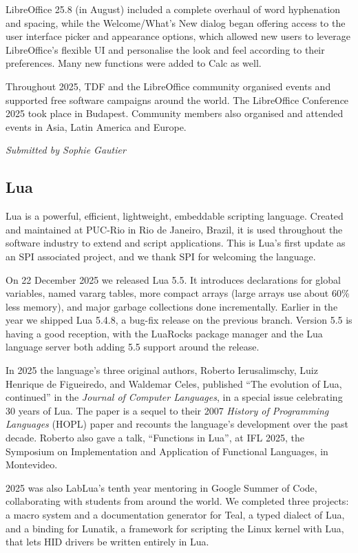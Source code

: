 \documentclass[a4paper]{report}
\begin{document}
LibreOffice 25.8 (in August) included a complete overhaul of word hyphenation and spacing, while the Welcome/What's New dialog began offering access to the user interface picker and appearance options, which allowed new users to leverage LibreOffice's flexible UI and personalise the look and feel according to their preferences. Many new functions were added to Calc as well.

Throughout 2025, TDF and the LibreOffice community organised events and supported free software campaigns around the world. The LibreOffice Conference 2025 took place in Budapest. Community members also organised and attended events in Asia, Latin America and Europe.

{\em Submitted by Sophie Gautier}

\subsection{Lua}

Lua is a powerful, efficient, lightweight, embeddable scripting language. Created and maintained at PUC-Rio in Rio de Janeiro, Brazil, it is used throughout the software industry to extend and script applications. This is Lua's first update as an SPI associated project, and we thank SPI for welcoming the language.

On 22 December 2025 we released Lua 5.5. It introduces declarations for global variables, named vararg tables, more compact arrays (large arrays use about 60\% less memory), and major garbage collections done incrementally. Earlier in the year we shipped Lua 5.4.8, a bug-fix release on the previous branch. Version 5.5 is having a good reception, with the LuaRocks package manager and the Lua language server both adding 5.5 support around the release.

In 2025 the language's three original authors, Roberto Ierusalimschy, Luiz Henrique de Figueiredo, and Waldemar Celes, published ``The evolution of Lua, continued'' in the \emph{Journal of Computer Languages}, in a special issue celebrating 30 years of Lua. The paper is a sequel to their 2007 \emph{History of Programming Languages} (HOPL) paper and recounts the language's development over the past decade. Roberto also gave a talk, ``Functions in Lua'', at IFL 2025, the Symposium on Implementation and Application of Functional Languages, in Montevideo.

2025 was also LabLua's tenth year mentoring in Google Summer of Code, collaborating with students from around the world. We completed three projects: a macro system and a documentation generator for Teal, a typed dialect of Lua, and a binding for Lunatik, a framework for scripting the Linux kernel with Lua, that lets HID drivers be written entirely in Lua.
\end{document}
